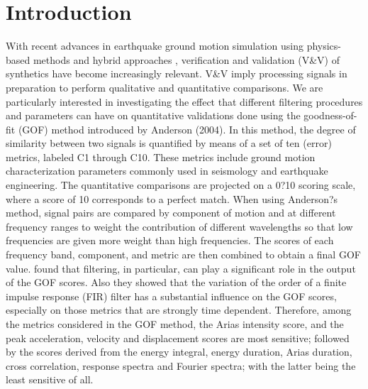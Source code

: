 
\section{Introduction}

With recent advances in earthquake ground motion simulation using physics-based methods and hybrid approaches \citep[e.g.,][]{Bielak_2010_GJI,Graves_2010}, verification and validation (V\&V) of synthetics have become increasingly relevant. V\&V imply processing signals in preparation to perform qualitative and quantitative comparisons. We are particularly interested in investigating the effect that different filtering procedures and parameters can have on quantitative validations done using the goodness-of-fit (GOF) method introduced by Anderson (2004). In this method, the degree of similarity between two signals is quantified by means of a set of ten (error) metrics, labeled C1 through C10. These metrics include ground motion characterization parameters commonly used in seismology and earthquake engineering. The quantitative comparisons are projected on a 0?10 scoring scale, where a score of 10 corresponds to a perfect match. When using Anderson?s method, signal pairs are compared by component of motion and at different frequency ranges to weight the contribution of different wavelengths so that low frequencies are given more weight than high frequencies.
The scores of each frequency band, component, and metric are then combined to obtain a final GOF value. \citet{Khoshnevis_2015} found that filtering, in particular, can play a significant role in the output of the GOF scores. Also they showed that the variation of the order of a finite impulse response (FIR) filter has a substantial influence on the GOF scores, especially on those metrics that are strongly time dependent. Therefore, among the metrics considered in the GOF method, the Arias intensity score, and the peak acceleration, velocity and displacement scores are most sensitive; followed by the scores derived from the energy integral, energy duration, Arias duration, cross correlation, response spectra and Fourier spectra; with the latter being the least sensitive of all.






